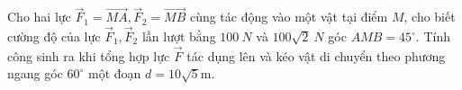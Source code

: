 \begin{bt}%
	Cho hai lực $\overrightarrow{F}_1=\overrightarrow{M A}, \overrightarrow{F}_2=\overrightarrow{M B}$ cùng tác động vào một vật tại điểm ${M}$, cho biết cường độ của lực $\overrightarrow{F}_1, \overrightarrow{F}_2$ lần lượt bằng $100 {~N}$ và $100 \sqrt{2} {~N}$ góc $\widehat{A M B}=45^{\circ}$. Tính công sinh ra khi tổng hợp lực $\overrightarrow{F}$ tác dụng lên và kéo vật di chuyển theo phương ngang góc $60^{\circ}$ một đoạn ${d}=10 \sqrt{5}$m.
\end{bt}

